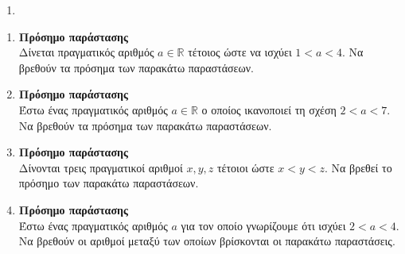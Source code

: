 \documentclass[twoside,nofonts,internet]{askhseis}
\begin{document}
\begin{enumerate}
\item 
\end{enumerate}
\twocolkentro{\askhseis}
\begin{enumerate}
\item \textbf{Πρόσημο παράστασης}\\
Δίνεται πραγματικός αριθμός $ a\in\mathbb{R} $ τέτοιος ώστε να ισχύει $ 1<a<4 $. Να βρεθούν τα πρόσημα των παρακάτω παραστάσεων.
\begin{multicols}{3}
\end{multicols}
\item \textbf{Πρόσημο παράστασης}\\
Έστω ένας πραγματικός αριθμός $ a\in\mathbb{R} $ ο οποίος ικανοποιεί τη σχέση $ 2<a<7 $. Να βρεθούν τα πρόσημα των παρακάτω παραστάσεων.
\item \textbf{Πρόσημο παράστασης}\\
Δίνονται τρεις πραγματικοί αριθμοί $ x,y,z $ τέτοιοι ώστε $ x<y<z $. Να βρεθεί το πρόσημο των παρακάτω παραστάσεων.
\item \textbf{Πρόσημο παράστασης}\\
Έστω ένας πραγματικός αριθμός $ a $ για τον οποίο γνωρίζουμε ότι ισχύει $ 2<a<4 $. Να βρεθούν οι αριθμοί μεταξύ των οποίων βρίσκονται οι παρακάτω παραστάσεις.
\begin{multicols}{3}
\begin{rlist}

\end{rlist}
\end{multicols}
\end{enumerate}
\end{document}
